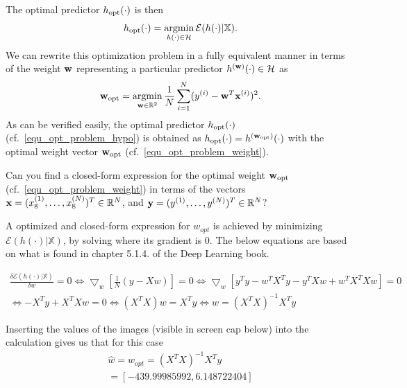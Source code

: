 \documentclass[article,11pt]{article}
\begin{document}
The optimal predictor $h_{\rm opt}(\cdot)$ is then
\vspace*{-3mm}
\begin{equation}
\label{equ_opt_problem_hypo}
h_{\rm opt}(\cdot)  = \argmin_{h(\cdot) \in \hypospace}  \emperror(h(\cdot) | \dataset). 
\vspace*{-2mm}
\end{equation}
We can rewrite this optimization problem in a fully equivalent manner in terms of the weight 
${\bf w}$ representing a particular predictor $h^{({\bf w})}(\cdot) \in \mathcal{H}$ as 
\vspace*{-5mm}
\begin{equation}
\label{equ_opt_problem_weight}
\vw_{\rm opt} = \argmin_{\vw \in \mathbb{R}^{2}}   \frac{1}{\samplesize}\sum^{\samplesize}_{\sampleidx=1}(y^{(\sampleidx)} - \vw^{T} \vx^{(\sampleidx)})^2. 
\vspace{-3mm}
\end{equation}
As can be verified easily, the optimal predictor $h_{\rm opt}(\cdot)$ (cf.\ \eqref{equ_opt_problem_hypo}) is obtained as 
$h_{\rm opt}(\cdot) = h^{({\bf w}_{\rm opt})}(\cdot)$ with the optimal weight vector ${\bf w}_{\rm opt}$ (cf.\ \eqref{equ_opt_problem_weight}).

Can you find a closed-form expression for the optimal weight ${\bf w}_{\rm opt}$ (cf.\ \eqref{equ_opt_problem_weight}) in terms of the vectors 
${\bf x} = (x_{\rm g}^{(1)},\ldots,x_{\rm g}^{(N)})^{T} \in \mathbb{R}^{N}$, and ${\bf y} = (y^{(1)}, \ldots,y^{(N)})^{T}\in \mathbb{R}^{N}$?

\vspace{3mm}

A optimized and closed-form expression for $w_{opt}$ is achieved by minimizing $\mathcal {E}(h(\cdot)|\mathbb{X})$, by solving where its gradient is 0. The below equations are based on what is found in chapter 5.1.4. of the Deep Learning book.  

$$
\begin{gathered}
\frac{\delta \mathcal {E}(h(\cdot)|\mathbb{X})}{\delta w} = 0 \Leftrightarrow \bigtriangledown_w [\frac{1}{N}(y-Xw)]= 0 \Leftrightarrow \bigtriangledown_w[y^T y - w^T X^T y - y^T Xw + w^T X^T Xw] = 0 \\ \Leftrightarrow -X^T y + X^T Xw = 0 \Leftrightarrow (X^T X)w = X^T y \Leftrightarrow w = (X^T X)^{-1} X^T y 
\end{gathered}
$$

Inserting the values of the images (visible in screen cap below) into the calculation gives us that for this case 
$$
\begin{gathered}
\hat{w} = w_{opt} = (X^T X)^{-1} X^Ty \\ = [-439.99985992, 6.148722404]
\end{gathered}
$$
\end{document}
